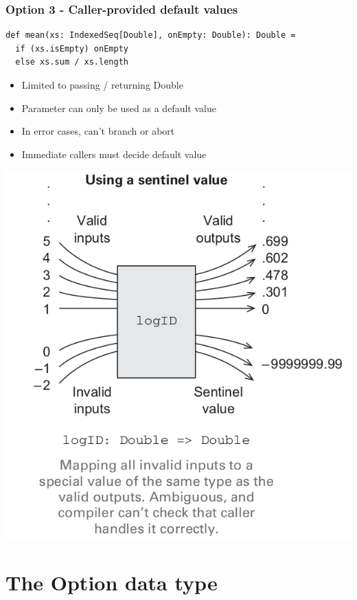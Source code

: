 \documentclass{beamer}
\begin{document}
\begin{frame}[fragile]
  \frametitle{Option 3 - Caller-provided default values}
\begin{lstlisting}
def mean(xs: IndexedSeq[Double], onEmpty: Double): Double =
  if (xs.isEmpty) onEmpty
  else xs.sum / xs.length
\end{lstlisting}
\begin{itemize}
  \item Limited to passing / returning {\ttfamily Double}
  \item Parameter can only be used as a default value
  \item In error cases, can't branch or abort
  \item Immediate callers must decide default value
\end{itemize}
\begin{center}
\includegraphics[scale=.15]{map-sentinel.png}
\end{center}
\end{frame}

\section{The {\ttfamily Option} data type}
\end{document}

